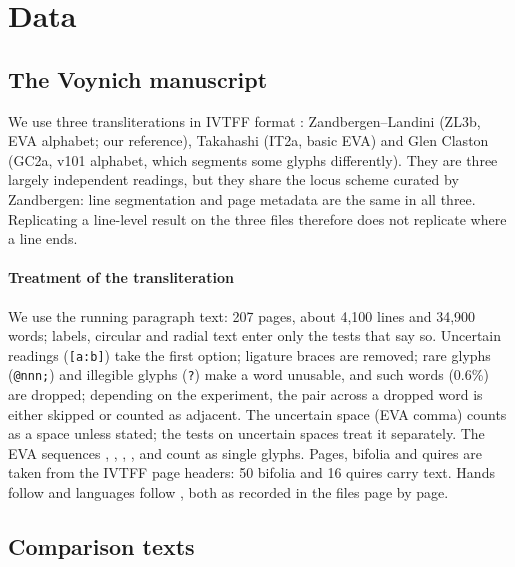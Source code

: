 \section{Data}
\label{sec:data}

\subsection{The Voynich manuscript}

We use three transliterations in IVTFF format \citep{zandbergen_ivtff,zandbergen_transliterations}: Zandbergen--Landini
(ZL3b, EVA alphabet; our reference), Takahashi (IT2a, basic EVA) and Glen Claston (GC2a, v101 alphabet, which segments
some glyphs differently). They are three largely independent readings, but they share the locus scheme curated by
Zandbergen: line segmentation and page metadata are the same in all three. Replicating a line-level result on the three
files therefore does not replicate where a line ends.

\paragraph{Treatment of the transliteration} We use the running paragraph text: 207 pages, about 4{,}100 lines and
34{,}900 words; labels, circular and radial text enter only the tests that say so. Uncertain readings
(\texttt{[a:b]}) take the first option; ligature braces are removed; rare glyphs (\texttt{@nnn;}) and illegible glyphs
(\texttt{?}) make a word unusable, and such words (0.6\%) are dropped; depending on the experiment, the pair across a
dropped word is either skipped or counted as adjacent. The uncertain space (EVA comma) counts as a space unless stated; the tests on
uncertain spaces treat it separately. The EVA sequences , , , ,  and
 count as single glyphs. Pages, bifolia and quires are taken from the IVTFF page headers: 50 bifolia and 16
quires carry text. Hands follow \citet{davis2020} and languages follow \citet{currier1976}, both as recorded in the files
page by page.

\subsection{Comparison texts}

